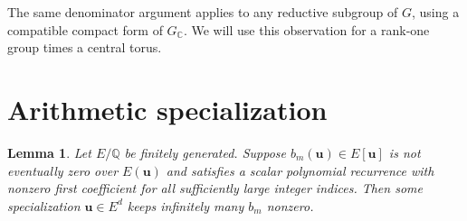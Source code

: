 \documentclass[11pt]{article}
\newtheorem{lemma}[theorem]{Lemma}
\newcommand{\CC}{\mathbb C}
\newcommand{\QQ}{\mathbb Q}
\begin{document}
The same denominator argument applies to any reductive subgroup of
\(G\), using a compatible compact form of \(G_\CC\). We will use this
observation for a rank-one group times a central torus.

\section{Arithmetic specialization}\label{sec:arithmetic}

\begin{lemma}\label{lem:specialize}
Let \(E/\QQ\) be finitely generated. Suppose
\(b_m(\boldsymbol u)\in E[\boldsymbol u]\) is not eventually zero over
\(E(\boldsymbol u)\) and satisfies a scalar polynomial recurrence
with nonzero first coefficient for all sufficiently large integer
indices. Then some specialization \(\boldsymbol u\in E^d\) keeps
infinitely many \(b_m\) nonzero.
\end{lemma}
\end{document}

